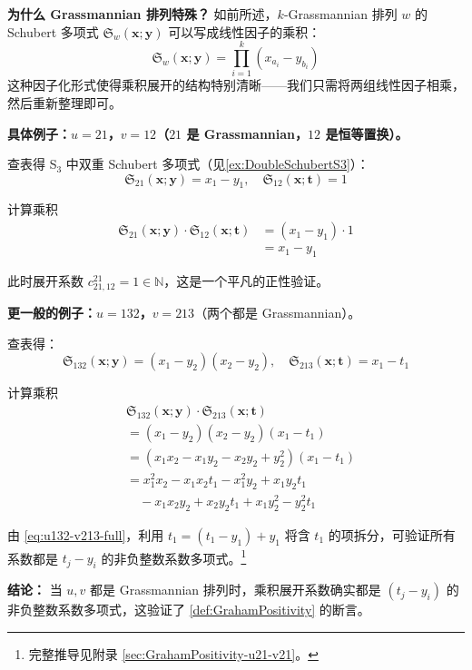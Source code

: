 \begin{Example}
\label{ex:GrahamPositivityExample}

\textbf{为什么 Grassmannian 排列特殊？}
如前所述，$k$-Grassmannian 排列 $w$ 的 Schubert 多项式 $\mathfrak{S}_w(\mathbf{x}; \mathbf{y})$ 可以写成线性因子的乘积：
$$\mathfrak{S}_w(\mathbf{x}; \mathbf{y}) = \prod_{i=1}^{k}(x_{a_i} - y_{b_i})$$
这种因子化形式使得乘积展开的结构特别清晰——我们只需将两组线性因子相乘，然后重新整理即可。

\textbf{具体例子：$u = 21$，$v = 12$（$21$ 是 Grassmannian，$12$ 是恒等置换）。}

查表得 S$_3$ 中双重 Schubert 多项式（见\cref{ex:DoubleSchubertS3}）：
$$\mathfrak{S}_{21}(\mathbf{x}; \mathbf{y}) = x_1 - y_1, \quad \mathfrak{S}_{12}(\mathbf{x}; \mathbf{t}) = 1$$

计算乘积
\begin{align*}
\mathfrak{S}_{21}(\mathbf{x}; \mathbf{y}) \cdot \mathfrak{S}_{12}(\mathbf{x}; \mathbf{t})
&= (x_1 - y_1) \cdot 1 \\
&= x_1 - y_1
\end{align*}

此时展开系数 $c^{21}_{21,12} = 1 \in \mathbb{N}$，这是一个平凡的正性验证。

\textbf{更一般的例子：$u = 132$，$v = 213$}（两个都是 Grassmannian）。

查表得：
$$\mathfrak{S}_{132}(\mathbf{x}; \mathbf{y}) = (x_1 - y_2)(x_2 - y_2), \quad \mathfrak{S}_{213}(\mathbf{x}; \mathbf{t}) = x_1 - t_1$$

计算乘积
\begin{align}
&\mathfrak{S}_{132}(\mathbf{x}; \mathbf{y}) \cdot \mathfrak{S}_{213}(\mathbf{x}; \mathbf{t}) \label{eq:u132-v213-product} \\
&= (x_1 - y_2)(x_2 - y_2)(x_1 - t_1) \label{eq:u132-v213-expand1} \\
&= (x_1 x_2 - x_1y_2 - x_2y_2 + y_2^2)(x_1 - t_1) \label{eq:u132-v213-expand2} \\
&= x_1^2 x_2 - x_1 x_2t_1 - x_1^2y_2 + x_1y_2t_1 \label{eq:u132-v213-expand3} \\
&\quad - x_1 x_2y_2 + x_2y_2t_1 + x_1y_2^2 - y_2^2t_1 \label{eq:u132-v213-full}
\end{align}

由 \cref{eq:u132-v213-full}，利用 $t_1 = (t_1 - y_1) + y_1$ 将含 $t_1$ 的项拆分，可验证所有系数都是 $t_j - y_i$ 的非负整数系数多项式。\footnote{完整推导见附录 \cref{sec:GrahamPositivity-u21-v21}。}

\textbf{结论：} 当 $u, v$ 都是 Grassmannian 排列时，乘积展开系数确实都是 $(t_j - y_i)$ 的非负整数系数多项式，这验证了 \cref{def:GrahamPositivity} 的断言。
\end{Example}

